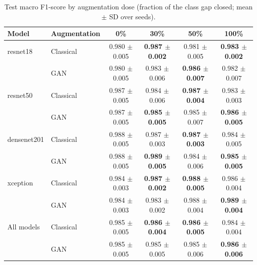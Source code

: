 \begin{table}[htbp]
\centering
\caption{Test macro F1-score by augmentation dose (fraction of the class gap closed; mean $\pm$ SD over seeds).}
\label{tab:dose_macro_f1}
\begin{tabular}{llcccc}
\toprule
Model & Augmentation & 0\% & 30\% & 50\% & 100\% \\
\midrule
resnet18 & Classical & 0.980 $\pm$ 0.005 & \textbf{0.987 $\pm$ 0.002} & 0.981 $\pm$ 0.005 & \textbf{0.983 $\pm$ 0.002} \\
 & GAN & 0.980 $\pm$ 0.005 & 0.983 $\pm$ 0.006 & \textbf{0.986 $\pm$ 0.007} & 0.982 $\pm$ 0.007 \\
\addlinespace
resnet50 & Classical & 0.987 $\pm$ 0.005 & 0.984 $\pm$ 0.006 & \textbf{0.987 $\pm$ 0.004} & 0.983 $\pm$ 0.003 \\
 & GAN & 0.987 $\pm$ 0.005 & \textbf{0.985 $\pm$ 0.005} & 0.985 $\pm$ 0.007 & \textbf{0.986 $\pm$ 0.005} \\
\addlinespace
densenet201 & Classical & 0.988 $\pm$ 0.005 & 0.987 $\pm$ 0.003 & \textbf{0.987 $\pm$ 0.003} & 0.984 $\pm$ 0.005 \\
 & GAN & 0.988 $\pm$ 0.005 & \textbf{0.989 $\pm$ 0.005} & 0.984 $\pm$ 0.006 & \textbf{0.985 $\pm$ 0.005} \\
\addlinespace
xception & Classical & 0.984 $\pm$ 0.003 & \textbf{0.987 $\pm$ 0.002} & \textbf{0.988 $\pm$ 0.005} & 0.986 $\pm$ 0.004 \\
 & GAN & 0.984 $\pm$ 0.003 & 0.983 $\pm$ 0.002 & 0.988 $\pm$ 0.004 & \textbf{0.989 $\pm$ 0.004} \\
\addlinespace
All models & Classical & 0.985 $\pm$ 0.005 & \textbf{0.986 $\pm$ 0.004} & \textbf{0.986 $\pm$ 0.005} & 0.984 $\pm$ 0.004 \\
 & GAN & 0.985 $\pm$ 0.005 & 0.985 $\pm$ 0.005 & 0.985 $\pm$ 0.006 & \textbf{0.986 $\pm$ 0.006} \\
\bottomrule
\end{tabular}
\end{table}